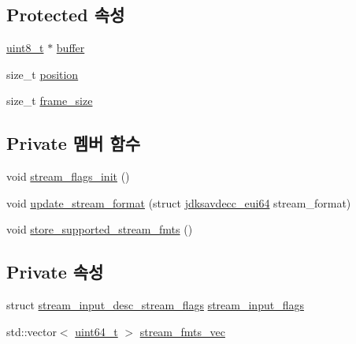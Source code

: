 \subsection*{Protected 속성}
\begin{DoxyCompactItemize}
\item 
\hyperlink{stdint_8h_aba7bc1797add20fe3efdf37ced1182c5}{uint8\+\_\+t} $\ast$ \hyperlink{classavdecc__lib_1_1descriptor__response__base__imp_a56ed84df35de10bdb65e72b184309497}{buffer}
\item 
size\+\_\+t \hyperlink{classavdecc__lib_1_1descriptor__response__base__imp_a7a04afe5347934be732ec70a70bd0a28}{position}
\item 
size\+\_\+t \hyperlink{classavdecc__lib_1_1descriptor__response__base__imp_affd041a595cabab98275245b9cb2824d}{frame\+\_\+size}
\end{DoxyCompactItemize}
\subsection*{Private 멤버 함수}
\begin{DoxyCompactItemize}
\item 
void \hyperlink{classavdecc__lib_1_1stream__input__descriptor__response__imp_a61edd2027d6d2e089f949076cc966006}{stream\+\_\+flags\+\_\+init} ()
\item 
void \hyperlink{classavdecc__lib_1_1stream__input__descriptor__response__imp_a5061d458a605eeb20e2c39359b14ba7e}{update\+\_\+stream\+\_\+format} (struct \hyperlink{structjdksavdecc__eui64}{jdksavdecc\+\_\+eui64} stream\+\_\+format)
\item 
void \hyperlink{classavdecc__lib_1_1stream__input__descriptor__response__imp_a66d3a0ab7d0f8bf40bcc903cd9415dcd}{store\+\_\+supported\+\_\+stream\+\_\+fmts} ()
\end{DoxyCompactItemize}
\subsection*{Private 속성}
\begin{DoxyCompactItemize}
\item 
struct \hyperlink{structavdecc__lib_1_1stream__input__descriptor__response__imp_1_1stream__input__desc__stream__flags}{stream\+\_\+input\+\_\+desc\+\_\+stream\+\_\+flags} \hyperlink{classavdecc__lib_1_1stream__input__descriptor__response__imp_ae4c5137e195c92f8b8991d082ff48ee4}{stream\+\_\+input\+\_\+flags}
\item 
std\+::vector$<$ \hyperlink{parse_8c_aec6fcb673ff035718c238c8c9d544c47}{uint64\+\_\+t} $>$ \hyperlink{classavdecc__lib_1_1stream__input__descriptor__response__imp_a1fd13ea03cfad2d7e41d304eb40af49a}{stream\+\_\+fmts\+\_\+vec}
\end{DoxyCompactItemize}


